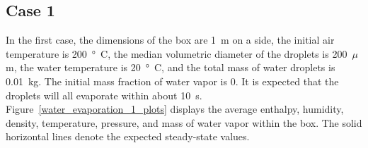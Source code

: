 \documentclass[11pt]{book}
\begin{document}
\subsection{Case 1}

In the first case, the dimensions of the box are 1~m on a side, the initial
air temperature is 200~\si{\degree C}, the median volumetric diameter of the droplets is 200~$\mu$m, the water temperature is 20~\si{\degree C}, and the total
mass of water droplets is 0.01~kg. The initial mass fraction of water vapor is 0.
It is expected that the droplets will all evaporate within about 10~s.
Figure~\ref{water_evaporation_1_plots} displays
the average enthalpy, humidity, density, temperature, pressure, and mass of water vapor within the box.
The solid horizontal lines denote the expected steady-state values.
\end{document}
